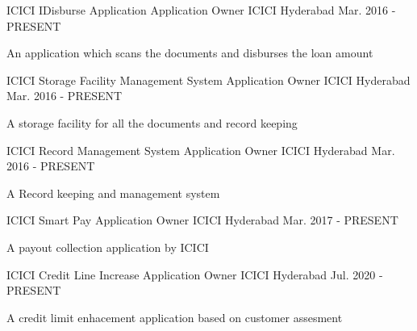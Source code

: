 \begin{cventries}
  \cventry
    {ICICI IDisburse Application}
    {Application Owner}
    {ICICI Hyderabad}
    {Mar. 2016 - PRESENT}
    {
      \begin{cvitems}
        \item {An application which scans the documents and disburses the loan amount}
      \end{cvitems}
    }
  \cventry
    {ICICI Storage Facility Management System}
    {Application Owner}
    {ICICI Hyderabad}
    {Mar. 2016 - PRESENT}
    {
      \begin{cvitems}
        \item {A storage facility for all the documents and record keeping}
      \end{cvitems}
    }
  \cventry
    {ICICI Record Management System}
    {Application Owner}
    {ICICI Hyderabad}
    {Mar. 2016 - PRESENT}
    {
      \begin{cvitems}
        \item {A Record keeping and management system}
      \end{cvitems}
    }
  \cventry
    {ICICI Smart Pay}
    {Application Owner}
    {ICICI Hyderabad}
    {Mar. 2017 - PRESENT}
    {
      \begin{cvitems}
        \item {A payout collection application by ICICI}
      \end{cvitems}
    }
  \cventry
    {ICICI Credit Line Increase}
    {Application Owner}
    {ICICI Hyderabad}
    {Jul. 2020 - PRESENT}
    {
      \begin{cvitems}
        \item {A credit limit enhacement application based on customer assesment}
      \end{cvitems}
    }
\end{cventries}
